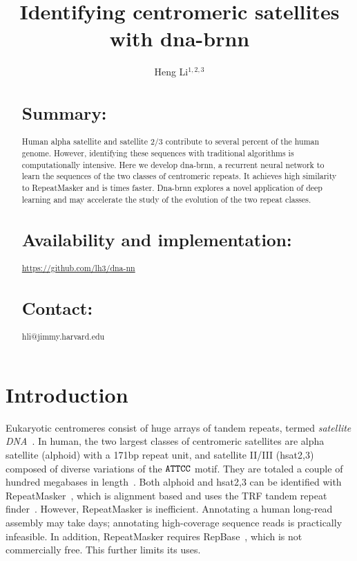 \documentclass{bioinfo}
\begin{document}

\title{Identifying centromeric satellites with dna-brnn}
\author[Li]{Heng Li$^{1,2,3}$}
\address{$^1$ Department of data sciences, Dana-Farber Cancer Institute, 450 Brookline Ave, Boston, MA 02115, USA\\
$^2$ Department of biomedical informatics, Harvard Medical School, 25 Shattuck Street, Boston, MA 02115, USA\\
$^3$ Broad Institute, 415 Main St, Cambridge, MA 02142, USA}

\maketitle

\begin{abstract}

\section{Summary:} Human alpha satellite and satellite 2/3 contribute to
several percent of the human genome. However, identifying these sequences with
traditional algorithms is computationally intensive. Here we develop dna-brnn,
a recurrent neural network to learn the sequences of the two classes of
centromeric repeats. It achieves high similarity to RepeatMasker and is times
faster. Dna-brnn explores a novel application of deep learning and may
accelerate the study of the evolution of the two repeat classes.

\section{Availability and implementation:}
\href{https://github.com/lh3/dna-nn}{https://github.com/lh3/dna-nn}

\section{Contact:} hli@jimmy.harvard.edu
\end{abstract}

\section{Introduction}

Eukaryotic centromeres consist of huge arrays of tandem repeats, termed
\emph{satellite DNA}~\citep{Garrido-Ramos:2017aa}. In human, the two largest
classes of centromeric satellites are alpha satellite (alphoid) with a 171bp
repeat unit, and satellite II/III (hsat2,3) composed of diverse variations of
the ${\tt ATTCC}$ motif. They are totaled a couple of hundred megabases in
length~\citep{Schneider:2017aa}. Both alphoid and hsat2,3 can be identified
with RepeatMasker~\citep{Tarailo-Graovac:2009aa}, which is alignment based and
uses the TRF tandem repeat finder~\citep{Benson:1999aa}. However, RepeatMasker
is inefficient. Annotating a human long-read assembly may take days; annotating
high-coverage sequence reads is practically infeasible. In addition,
RepeatMasker requires RepBase~\citep{Kapitonov:2008aa}, which is not
commercially free. This further limits its uses.
\end{document}
